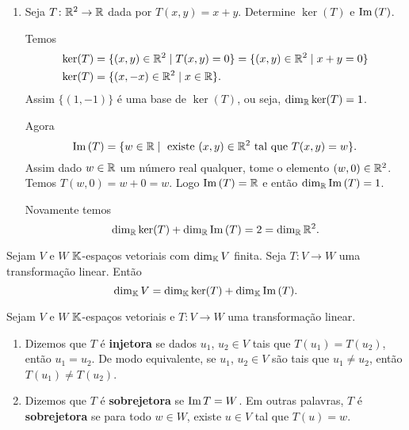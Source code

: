 \begin{exemplos}
\begin{enumerate}[label={\arabic*})]
    \item Seja $T \colon \mathbb{R}^2 \to \mathbb{R}$ dada por $T(x,y) = x + y$. Determine $\ker(T)$ e ${\rm Im\,}(T)$.
    \begin{solucao}
      Temos
      \begin{align*}
        \ker(T) &= \{(x,y) \in \mathbb{R}^2 \mid T(x,y) = 0\} = \{(x,y) \in \mathbb{R}^2 \mid x + y = 0\}\\
        \ker(T) &= \{(x,-x) \in \mathbb{R}^2 \mid x \in \mathbb{R}\}.
      \end{align*}
      Assim $\{(1,-1)\}$ é uma base de $\ker(T)$, ou seja, $\dim_{\mathbb{R}}\ker(T) = 1$.

      Agora
      \[
        {\rm Im\,}(T) = \{w \in \mathbb{R} \mid \mbox{ existe } (x,y) \in \mathbb{R}^2 \mbox{ tal que } T(x,y) = w\}.
      \]
      Assim dado $w \in \mathbb{R}$ um número real qualquer, tome o elemento $(w,0) \in \mathbb{R}^2$. Temos $T(w,0) = w + 0 = w$. Logo ${\rm Im\,}(T) = \mathbb{R}$ e então $\dim_{\mathbb{R}}{\rm Im\,}(T) = 1$.

      Novamente temos
      \[
        \dim_{\mathbb{R}}\ker(T) + \dim_{\mathbb{R}}{\rm Im\,}(T) = 2 = \dim_{\mathbb{R}}\mathbb{R}^2.
      \]
    \end{solucao}
  \end{enumerate}
\end{exemplos}

\begin{teorema}\label{teorema_do_nucleo_e_da_imagem}
  Sejam $V$ e $W$ $\mathbb{K}$-espaços vetoriais com $\dim_{\mathbb{K}}V$ finita. Seja $T : V \to W$ uma transformação linear. Então
  \[
    \dim_{\mathbb{K}}V = \dim_{\mathbb{K}}\ker(T) + \dim_{\mathbb{K}}{\rm Im\,}(T).
  \]
\end{teorema}

\begin{definicao}
  Sejam $V$ e $W$ $\mathbb{K}$-espaços vetoriais e $T \colon V \to W$ uma transformação linear.
  \begin{enumerate}[label={\roman*})]
    \item Dizemos que $T$ é \textbf{injetora} se dados $u_1$, $u_2 \in V$ tais que $T(u_1) = T(u_2)$, então $u_1 = u_2$. De modo equivalente, se $u_1$, $u_2 \in V$ são tais que $u_1 \ne u_2$, então $T(u_1) \ne T(u_2)$.

    \item Dizemos que $T$ é \textbf{sobrejetora} se ${\rm Im\,} T = W$. Em outras palavras, $T$ é \textbf{sobrejetora} se para todo $w \in W$, existe $u \in V$ tal que $T(u) = w$.
  \end{enumerate}
\end{definicao}

